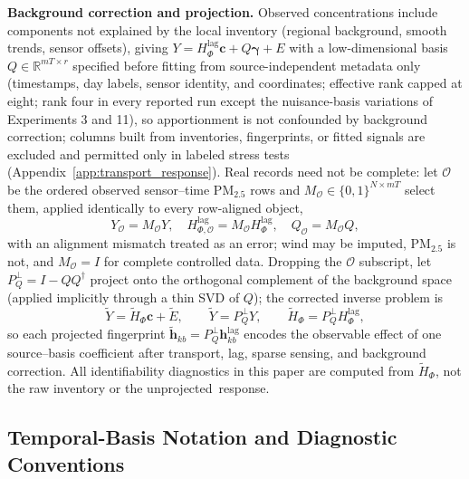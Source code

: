 \noindent\textbf{Background correction and projection.}\label{subsec:background_construction}
Observed concentrations include components not explained by the local inventory
(regional background, smooth trends, sensor offsets), giving
\(Y = H_{\Phi}^{\mathrm{lag}}\mathbf c + Q\boldsymbol\gamma + E\) with a
low-dimensional basis \(Q\in \mathbb R^{mT\times r}\) specified before fitting from
source-independent metadata only (timestamps, day labels, sensor identity, and
coordinates; effective rank capped at eight; rank four in every reported run except
the nuisance-basis variations of Experiments 3 and 11),
so apportionment is not confounded by background correction; columns built from
inventories, fingerprints, or fitted signals are excluded and permitted only in
labeled stress tests (Appendix~\ref{app:transport_response}).  Real records need
not be complete: let \(\mathcal O\) be the ordered observed sensor--time
PM\(_{2.5}\) rows and \(M_{\mathcal O}\in\{0,1\}^{N\times mT}\) select them, applied
identically to every row-aligned object,
\begin{equation}
Y_{\mathcal O}=M_{\mathcal O}Y,\quad
H_{\Phi,\mathcal O}^{\mathrm{lag}}
=M_{\mathcal O}H_{\Phi}^{\mathrm{lag}},\quad
Q_{\mathcal O}=M_{\mathcal O}Q,
\label{eq:observation_selection_app}
\end{equation}
with an alignment mismatch treated as an error;
wind may be imputed, PM\(_{2.5}\) is not, and \(M_{\mathcal O}=I\) for complete
controlled data.  Dropping the \(\mathcal O\) subscript, let
\(P_Q^\perp = I - QQ^\dagger\) project onto the orthogonal complement of the
background space (applied implicitly through a thin SVD of \(Q\)); the corrected
inverse problem is
\begin{equation}
\widetilde Y = \widetilde H_\Phi\mathbf c + \widetilde E,
\qquad
\widetilde Y=P_Q^\perp Y,
\qquad
\widetilde H_\Phi=P_Q^\perp H_{\Phi}^{\mathrm{lag}},
\label{eq:projected_model_app}
\end{equation}
so each projected fingerprint
\(\widetilde{\mathbf h}_{kb}=P_Q^\perp\mathbf h_{kb}^{\mathrm{lag}}\) encodes the
observable effect of one source--basis coefficient after transport, lag, sparse
sensing, and background correction.  All identifiability diagnostics in this paper
are computed from \(\widetilde H_\Phi\), not the raw inventory or the
\mbox{unprojected response}.

\subsection{Temporal-Basis Notation and Diagnostic Conventions}
\label{app:temporal_basis_notation}

